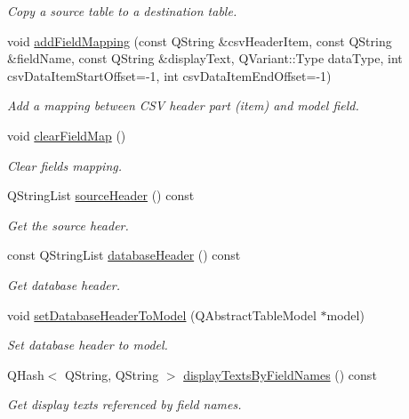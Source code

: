\begin{DoxyCompactItemize}
\begin{DoxyCompactList}\small\item\em Copy a source table to a destination table. \end{DoxyCompactList}\item 
void \hyperlink{classmdt_data_table_manager_a2b38e6a8157183fcbce0770d12e9aa9d}{addFieldMapping} (const QString \&csvHeaderItem, const QString \&fieldName, const QString \&displayText, QVariant::Type dataType, int csvDataItemStartOffset=-\/1, int csvDataItemEndOffset=-\/1)
\begin{DoxyCompactList}\small\item\em Add a mapping between CSV header part (item) and model field. \end{DoxyCompactList}\item 
void \hyperlink{classmdt_data_table_manager_a10c9f9d57d6c35fa5721906c79376ec4}{clearFieldMap} ()
\begin{DoxyCompactList}\small\item\em Clear fields mapping. \end{DoxyCompactList}\item 
\hypertarget{classmdt_data_table_manager_a5cafc38a5570c51757dbac7e8c2fd978}{
QStringList \hyperlink{classmdt_data_table_manager_a5cafc38a5570c51757dbac7e8c2fd978}{sourceHeader} () const }
\label{classmdt_data_table_manager_a5cafc38a5570c51757dbac7e8c2fd978}

\begin{DoxyCompactList}\small\item\em Get the source header. \end{DoxyCompactList}\item 
\hypertarget{classmdt_data_table_manager_a0edc657a7dbcfcf251e6ce27560d40e5}{
const QStringList \hyperlink{classmdt_data_table_manager_a0edc657a7dbcfcf251e6ce27560d40e5}{databaseHeader} () const }
\label{classmdt_data_table_manager_a0edc657a7dbcfcf251e6ce27560d40e5}

\begin{DoxyCompactList}\small\item\em Get database header. \end{DoxyCompactList}\item 
\hypertarget{classmdt_data_table_manager_aba44e2b905b6fc959306ca9b5a786d84}{
void \hyperlink{classmdt_data_table_manager_aba44e2b905b6fc959306ca9b5a786d84}{setDatabaseHeaderToModel} (QAbstractTableModel $\ast$model)}
\label{classmdt_data_table_manager_aba44e2b905b6fc959306ca9b5a786d84}

\begin{DoxyCompactList}\small\item\em Set database header to model. \end{DoxyCompactList}\item 
QHash$<$ QString, QString $>$ \hyperlink{classmdt_data_table_manager_ac8884e4e2d58c6f7e3db180aca5a2772}{displayTextsByFieldNames} () const 
\begin{DoxyCompactList}\small\item\em Get display texts referenced by field names. \end{DoxyCompactList}\end{DoxyCompactItemize}
